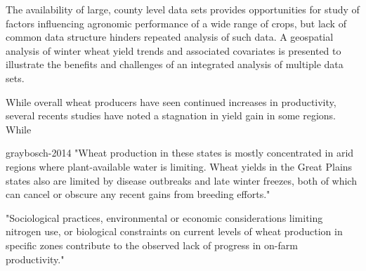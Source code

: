 \documentclass[paperwidth=42in,paperheight=44in]{baposter}
\begin{document}
\begin{poster}
{The availability of large, county level data sets provides opportunities for study of factors influencing agronomic performance of a wide range of crops, but lack of common data structure hinders repeated analysis of such data. A geospatial analysis of winter wheat yield trends and associated covariates is presented to illustrate the benefits and challenges of an integrated analysis of multiple data sets.

While overall wheat producers have seen continued increases in productivity, several recents studies have noted a stagnation in yield gain in some regions. While 

graybosch-2014
"Wheat production in these states is mostly concentrated in arid
regions where plant-available water is limiting. Wheat yields in the Great Plains
states also are limited by disease outbreaks and late winter freezes, both of which
can cancel or obscure any recent gains from breeding efforts."

"Sociological practices, environmental or economic considerations limiting nitrogen
use, or biological constraints on current levels of wheat production in specific zones
contribute to the observed lack of progress in on-farm productivity."

}


\end{poster}
\end{document}
